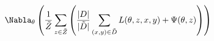 \documentclass[preview]{standalone}
\begin{document}
\begin{align*}
\Nabla_{\theta} \left(\frac{1}{\tilde Z} \sum_{z \in \tilde Z} \left( \frac{|D|}{|\tilde D |} \sum_{(x,y) \in \tilde D} L (\theta, z, x, y) + \Psi (\theta, z) \right) \right)
\end{align*}
\end{document}
